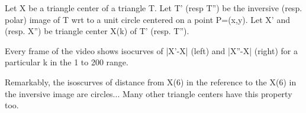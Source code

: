 Let X be a triangle center of a triangle T. Let T' (resp T'')  be the inversive  (resp. polar) image of T wrt to a unit circle centered on a point P=(x,y). Let X' and (resp. X'') be triangle center X(k) of T' (resp. T'').

Every frame of the video shows isocurves of |X'-X| (left) and |X''-X| (right) for a particular k in the 1 to 200 range.

Remarkably, the isoscurves of distance from X(6) in the reference to the X(6) in the inversive image are circles... Many other triangle centers have this property too.